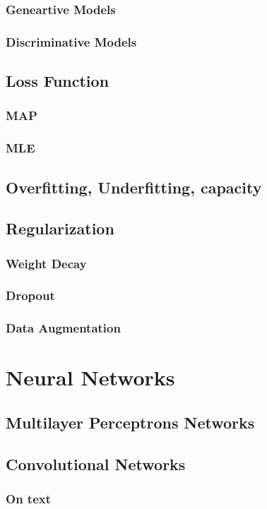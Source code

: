\documentclass[11pt,oneside,a4paper]{book}
\theoremstyle{definition}
\DeclareRobustCommand{\[}{\begin{equation}}
\DeclareRobustCommand{\]}{\end{equation}}
\begin{document}
\subsubsection{Geneartive Models}
\subsubsection{Discriminative Models}
\subsection{Loss Function}
\subsubsection{MAP}
\subsubsection{MLE}
\subsection{Overfitting, Underfitting, capacity}
\subsection{Regularization}
\subsubsection{Weight Decay}
\subsubsection{Dropout}
\subsubsection{Data Augmentation}

\section{Neural Networks}
    \subsection{Multilayer Perceptrons Networks}
    \subsection{Convolutional Networks}
        \subsubsection{On text}
\end{document}
